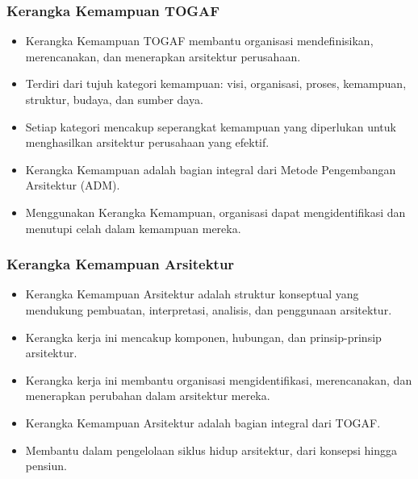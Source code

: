 \documentclass{beamer}
\begin{document}
	\begin{frame}
		\frametitle{Kerangka Kemampuan TOGAF}
		\begin{itemize}
			\item Kerangka Kemampuan TOGAF membantu organisasi mendefinisikan, merencanakan, dan menerapkan arsitektur perusahaan.
			\item Terdiri dari tujuh kategori kemampuan: visi, organisasi, proses, kemampuan, struktur, budaya, dan sumber daya.
			\item Setiap kategori mencakup seperangkat kemampuan yang diperlukan untuk menghasilkan arsitektur perusahaan yang efektif.
			\item Kerangka Kemampuan adalah bagian integral dari Metode Pengembangan Arsitektur (ADM).
			\item Menggunakan Kerangka Kemampuan, organisasi dapat mengidentifikasi dan menutupi celah dalam kemampuan mereka.
		\end{itemize}
	\end{frame}
	
	\begin{frame}
		\frametitle{Kerangka Kemampuan Arsitektur}
		\begin{itemize}
			\item Kerangka Kemampuan Arsitektur adalah struktur konseptual yang mendukung pembuatan, interpretasi, analisis, dan penggunaan arsitektur.
			\item Kerangka kerja ini mencakup komponen, hubungan, dan prinsip-prinsip arsitektur.
			\item Kerangka kerja ini membantu organisasi mengidentifikasi, merencanakan, dan menerapkan perubahan dalam arsitektur mereka.
			\item Kerangka Kemampuan Arsitektur adalah bagian integral dari TOGAF.
			\item Membantu dalam pengelolaan siklus hidup arsitektur, dari konsepsi hingga pensiun.
		\end{itemize}
	\end{frame}
	
\end{document}

